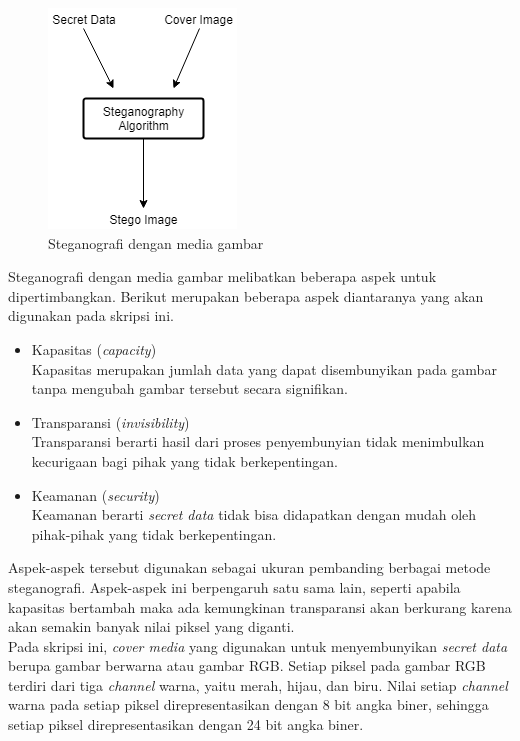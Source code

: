 \documentclass[a4paper,twoside]{article}
\begin{document}
\begin{enumerate}
\begin{itemize}
		\begin{figure}[!htbp]
		\centering
		\includegraphics[scale=0.7]{Embedding.png}
		\caption{Steganografi dengan media gambar}
		\label{fig:imagestegano}
		\end{figure} 
		
		Steganografi dengan media gambar melibatkan beberapa aspek untuk dipertimbangkan. Berikut merupakan beberapa aspek diantaranya yang akan digunakan pada skripsi ini.
		\begin{itemize}		
		\item Kapasitas (\textit{capacity})\\
		Kapasitas merupakan jumlah data yang dapat disembunyikan pada gambar tanpa mengubah gambar tersebut secara signifikan.
		\item Transparansi (\textit{invisibility})\\
		Transparansi berarti hasil dari proses penyembunyian tidak menimbulkan kecurigaan bagi pihak yang tidak berkepentingan.	
		\item Keamanan (\textit{security})\\
		Keamanan berarti \textit{secret data} tidak bisa didapatkan dengan mudah oleh pihak-pihak yang tidak berkepentingan.
		\end{itemize}
		
		Aspek-aspek tersebut digunakan sebagai ukuran pembanding berbagai metode steganografi. Aspek-aspek ini berpengaruh satu sama lain, seperti apabila kapasitas bertambah maka ada kemungkinan transparansi akan berkurang karena akan semakin banyak nilai piksel yang diganti.\\
		
		Pada skripsi ini, \textit{cover media} yang digunakan untuk menyembunyikan \textit{secret data} berupa gambar berwarna atau gambar RGB. Setiap piksel pada gambar RGB terdiri dari tiga \textit{channel} warna, yaitu merah, hijau, dan biru. Nilai setiap \textit{channel} warna pada setiap piksel direpresentasikan dengan 8 bit angka biner, sehingga setiap piksel direpresentasikan dengan 24 bit angka biner.\\
		

\end{itemize}
\end{enumerate}
\end{document}
